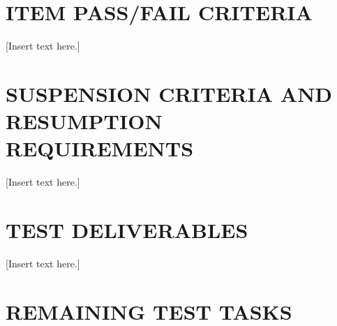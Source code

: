 \documentclass[twoside,letterpaper]{article}
\begin{document}
\section[ITEM PASS/FAIL CRITERIA]
{\bfseries ITEM PASS/FAIL CRITERIA}

[Insert text here.]


\section[SUSPENSION CRITERIA]
{\bfseries SUSPENSION CRITERIA AND RESUMPTION 
\\REQUIREMENTS}

[Insert text here.]

\section[TEST DELIVERABLES]
{\bfseries TEST DELIVERABLES}

[Insert text here.]

\section[REMAINING TEST TASKS]{\bfseries REMAINING TEST TASKS}

\end{document}
